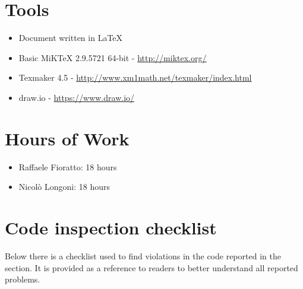 \newpage
\begin{appendices}
\section{Tools}
\begin{itemize}
	\item Document written in \LaTeX
	\item Basic MiKTeX 2.9.5721 64-bit - \url{http://miktex.org/}
	\item Texmaker 4.5 - \url{http://www.xm1math.net/texmaker/index.html}
	\item draw.io - \url{https://www.draw.io/}
\end{itemize}
\break
\section{Hours of Work}
\begin{itemize}
	\item Raffaele Fioratto: 18 hours
	\item Nicol\`{o} Longoni: 18 hours
\end{itemize}
\break
\section{Code inspection checklist}
Below there is a checklist used to find violations in the code reported in the  section. It is provided as a reference to readers to better understand all reported problems.

\end{appendices}